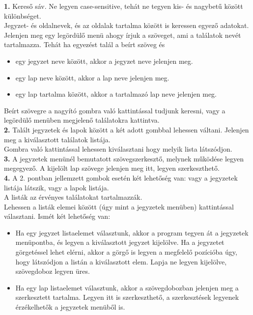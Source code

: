 \vspace{5pt} \noindent \textbf{1.} Kereső sáv. Ne legyen case-sensitive, tehát ne tegyen kis- és nagybetű között különbséget.
\\Jegyzet- és oldalnevek, és az oldalak tartalma között is keressen egyező adatokat.
\\Jelenjen meg egy legördülő menü ahogy írjuk a szöveget, ami a találatok nevét tartalmazza. Tehát ha egyezést talál a beírt szöveg és 
\begin{itemize}
	\item egy jegyzet neve között, akkor a jegyzet neve jelenjen meg.
	\item egy lap neve között, akkor a lap neve jelenjen meg.
	\item egy lap tartalma között, akkor a tartalmazó lap neve jelenjen meg.
\end{itemize}
Beírt szövegre a nagyító gombra való kattintással tudjunk keresni, vagy a legördülő menüben megjelenő találatokra kattintva. 
\vspace{5pt} \\ \textbf{2.} Talált jegyzetek és lapok között a két adott gombbal lehessen váltani. Jelenjen meg a kiválasztott találatok listája.
\\Gombra való kattintással lehessen kiválasztani hogy melyik lista látszódjon.
\vspace{5pt} \\ \textbf{3.} A jegyzetek menünél bemutatott szövegszerkesztő, melynek működése legyen megegyező.
A kijelölt lap szövege jelenjen meg itt, legyen szerkeszthető.
\vspace{5pt} \\ \textbf{4.} A 2. pontban jellemzett gombok esetén két lehetőség van: vagy a jegyzetek listája látszik, vagy a lapok listája. 
\\A listák az érvényes találatokat tartalmazzák.
\\Lehessen a listák elemei között (úgy mint a jegyzetek menüben) kattintással választani. Ismét két lehetőség van:
\begin{itemize}
	\item Ha egy jegyzet listaelemet választunk, akkor a program tegyen át a jegyzetek menüpontba, és legyen a kiválasztott jegyzet kijelölve. Ha a jegyzetet görgetéssel lehet elérni, akkor a görgő is legyen a megfelelő pozícióba úgy, hogy látszódjon a listán a kiválasztott elem. Lapja ne legyen kijelölve, szövegdoboz legyen üres.
	\item Ha egy lap listaelemet választunk, akkor a szövegdobozban jelenjen meg a szerkesztett tartalma. Legyen itt is szerkeszthető, a szerkesztések legyenek érzékelhetők a jegyzetek menüből is.
\end{itemize}

